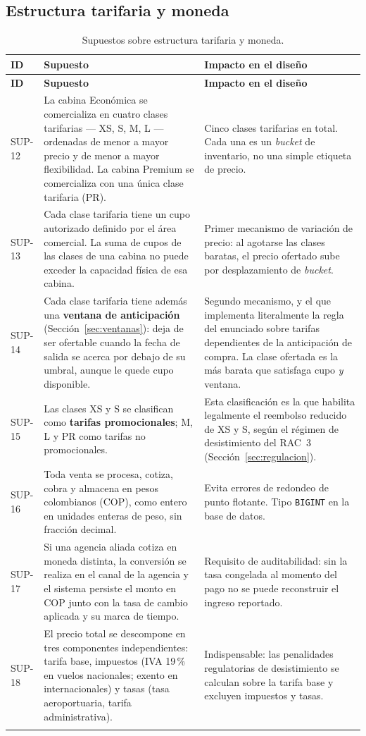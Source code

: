 \documentclass[10pt,letterpaper]{article}
\begin{document}
\subsection{Estructura tarifaria y moneda}
\begin{longtable}{@{}L{1.7cm} L{7.4cm} L{6.1cm}@{}}
\toprule
\textbf{ID} & \textbf{Supuesto} & \textbf{Impacto en el diseño} \\
\midrule
\endfirsthead
\toprule
\textbf{ID} & \textbf{Supuesto} & \textbf{Impacto en el diseño} \\
\midrule
\endhead
SUP-12 & La cabina Económica se comercializa en cuatro clases tarifarias --- XS, S, M, L --- ordenadas de menor a mayor precio y de menor a mayor flexibilidad. La cabina Premium se comercializa con una única clase tarifaria (PR). & Cinco clases tarifarias en total. Cada una es un \emph{bucket} de inventario, no una simple etiqueta de precio. \\
SUP-13 & Cada clase tarifaria tiene un cupo autorizado definido por el área comercial. La suma de cupos de las clases de una cabina no puede exceder la capacidad física de esa cabina. & Primer mecanismo de variación de precio: al agotarse las clases baratas, el precio ofertado sube por desplazamiento de \emph{bucket}. \\
SUP-14 & Cada clase tarifaria tiene además una \textbf{ventana de anticipación} (Sección~\ref{sec:ventanas}): deja de ser ofertable cuando la fecha de salida se acerca por debajo de su umbral, aunque le quede cupo disponible. & Segundo mecanismo, y el que implementa literalmente la regla del enunciado sobre tarifas dependientes de la anticipación de compra. La clase ofertada es la más barata que satisfaga cupo \emph{y} ventana. \\
SUP-15 & Las clases XS y S se clasifican como \textbf{tarifas promocionales}; M, L y PR como tarifas no promocionales. & Esta clasificación es la que habilita legalmente el reembolso reducido de XS y S, según el régimen de desistimiento del RAC~3 (Sección~\ref{sec:regulacion}). \\
SUP-16 & Toda venta se procesa, cotiza, cobra y almacena en pesos colombianos (COP), como entero en unidades enteras de peso, sin fracción decimal. & Evita errores de redondeo de punto flotante. Tipo \texttt{BIGINT} en la base de datos. \\
SUP-17 & Si una agencia aliada cotiza en moneda distinta, la conversión se realiza en el canal de la agencia y el sistema persiste el monto en COP junto con la tasa de cambio aplicada y su marca de tiempo. & Requisito de auditabilidad: sin la tasa congelada al momento del pago no se puede reconstruir el ingreso reportado. \\
SUP-18 & El precio total se descompone en tres componentes independientes: tarifa base, impuestos (IVA 19\,\% en vuelos nacionales; exento en internacionales) y tasas (tasa aeroportuaria, tarifa administrativa). & Indispensable: las penalidades regulatorias de desistimiento se calculan sobre la tarifa base y excluyen impuestos y tasas. \\
\bottomrule
\caption{Supuestos sobre estructura tarifaria y moneda.}
\end{longtable}
\end{document}
